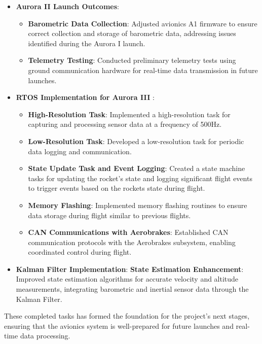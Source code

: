 \begin{itemize}
\begin{itemize}
\end{itemize}
    \item \textbf{Aurora II Launch Outcomes}:
    \begin{itemize}
        \item \textbf{Barometric Data Collection}: Adjusted avionics A1 firmware to ensure correct collection and storage of barometric data, addressing issues identified during the Aurora I launch.
        \item \textbf{Telemetry Testing}: Conducted preliminary telemetry tests using ground communication hardware for real-time data transmission in future launches.
    \end{itemize}
    \item \textbf{RTOS Implementation for Aurora III }:
    \begin{itemize}
        \item \textbf{High-Resolution Task}: Implemented a high-resolution task for capturing and processing sensor data at a frequency of 500Hz.
        \item \textbf{Low-Resolution Task}: Developed a low-resolution task for periodic data logging and communication.
        \item \textbf{State Update Task and Event Logging}: Created a state machine tasks for updating the rocket's state and logging significant flight events to trigger events based on the rockets state during flight.
        \item \textbf{Memory Flashing}: Implemented memory flashing routines to ensure data storage during flight similar to previous flights.
        \item \textbf{CAN Communications with Aerobrakes}: Established CAN communication protocols with the Aerobrakes subsystem, enabling coordinated control during flight.
    \end{itemize}
    \item \textbf{Kalman Filter Implementation}:
\textbf{State Estimation Enhancement}: Improved state estimation algorithms for accurate velocity and altitude measurements, integrating barometric and inertial sensor data through the Kalman Filter.

\end{itemize}

These completed tasks has formed the foundation for the project's next stages, ensuring that the avionics system is well-prepared for future launches and real-time data processing.


